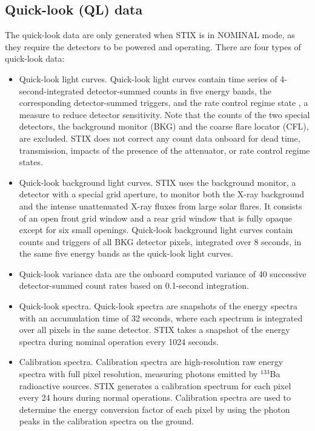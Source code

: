 \documentclass[referee]{preaa} %
\begin{document}
\subsection{Quick-look (QL) data}
The quick-look data are only generated when STIX is in NOMINAL mode, as they require the detectors to be powered and operating. There are four types of quick-look data:
\begin{itemize}
\item Quick-look light curves. Quick-look light curves contain time series of 4-second-integrated detector-summed counts in five energy bands, the corresponding detector-summed triggers, and the rate control regime state \citep{stix2020}, a measure to reduce detector sensitivity. Note that the counts of the two special detectors, the background monitor (BKG) and the coarse flare locator (CFL), are excluded. STIX does not correct any count data onboard for dead time, transmission, impacts of the presence of the attenuator, or rate control regime states.

\item Quick-look background light curves. STIX uses the background monitor, a detector with a special grid aperture, to monitor both the X-ray background and the intense unattenuated X-ray fluxes from large solar flares. It consists of an open front grid window and a rear grid window that is fully opaque except for six small openings. Quick-look background light curves contain counts and triggers of all BKG detector pixels, integrated over 8 seconds, in the same five energy bands as the quick-look light curves. 

\item Quick-look variance data are the onboard computed variance of 40 successive detector-summed count rates based on 0.1-second integration.

\item Quick-look spectra. Quick-look spectra are snapshots of the energy spectra with an accumulation time of 32 seconds, where each spectrum is integrated over all pixels in the same detector. STIX takes a snapshot of the energy spectra during nominal operation every 1024 seconds.

\item Calibration spectra. Calibration spectra are high-resolution raw energy spectra with full pixel resolution, measuring photons emitted by $^{133}$Ba radioactive sources. STIX generates a calibration spectrum for each pixel every 24 hours during normal operations. Calibration spectra are used to determine the energy conversion factor of each pixel by using the photon peaks in the calibration spectra on the ground.  
\end{itemize}
\end{document}
